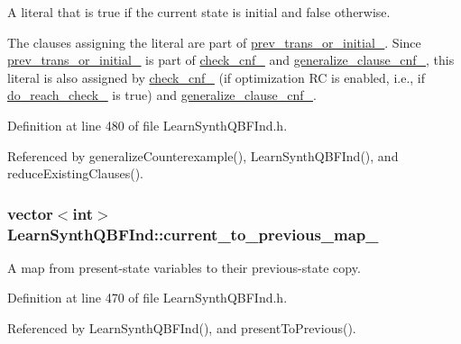 A literal that is true if the current state is initial and false otherwise. 

The clauses assigning the literal are part of \hyperlink{classLearnSynthQBFInd_ad99eafb7ee9134115f9fbe986e5eb0c5}{prev\-\_\-trans\-\_\-or\-\_\-initial\-\_\-}. Since \hyperlink{classLearnSynthQBFInd_ad99eafb7ee9134115f9fbe986e5eb0c5}{prev\-\_\-trans\-\_\-or\-\_\-initial\-\_\-} is part of \hyperlink{classLearnSynthQBFInd_ac90a4574da82c96888db219291368554}{check\-\_\-cnf\-\_\-} and \hyperlink{classLearnSynthQBFInd_ad61b112cfcc60506f7b21c9ea9267b37}{generalize\-\_\-clause\-\_\-cnf\-\_\-}, this literal is also assigned by \hyperlink{classLearnSynthQBFInd_ac90a4574da82c96888db219291368554}{check\-\_\-cnf\-\_\-} (if optimization R\-C is enabled, i.\-e., if \hyperlink{classLearnSynthQBFInd_af87e4a2c1d17c4c5bc398082d6d3e365}{do\-\_\-reach\-\_\-check\-\_\-} is true) and \hyperlink{classLearnSynthQBFInd_ad61b112cfcc60506f7b21c9ea9267b37}{generalize\-\_\-clause\-\_\-cnf\-\_\-}. 

Definition at line 480 of file Learn\-Synth\-Q\-B\-F\-Ind.\-h.



Referenced by generalize\-Counterexample(), Learn\-Synth\-Q\-B\-F\-Ind(), and reduce\-Existing\-Clauses().

\hypertarget{classLearnSynthQBFInd_a8047ab13c44736c39c11f9c0b48e29cf}{
\subsubsection[{current\-\_\-to\-\_\-previous\-\_\-map\-\_\-}]{\setlength{\rightskip}{0pt plus 5cm}vector$<$int$>$ Learn\-Synth\-Q\-B\-F\-Ind\-::current\-\_\-to\-\_\-previous\-\_\-map\-\_\-\hspace{0.3cm}{\ttfamily [protected]}}}\label{classLearnSynthQBFInd_a8047ab13c44736c39c11f9c0b48e29cf}


A map from present-\/state variables to their previous-\/state copy. 



Definition at line 470 of file Learn\-Synth\-Q\-B\-F\-Ind.\-h.



Referenced by Learn\-Synth\-Q\-B\-F\-Ind(), and present\-To\-Previous().

